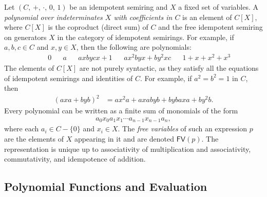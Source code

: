 \documentclass[copyright,creativecommons]{eptcs}
\theoremstyle{remark}
\newcommand\mathname[1]{\ensuremath{\mathsf{#1}}}
\newcommand\FV[1]{\mathname{FV}(#1)}
\newcommand\Tname{\mathname{T}}
\newcommand\T[1]{\Tname\,#1}
\newcommand{\fhcomment}[1]{\textcolor{red}{[\textbf{Comment (FH)}: {#1}]}}
\newcommand{\dkcomment}[1]{\textcolor{blue}{[\textbf{Comment (DK)}: {#1}]}}
\renewcommand{\fhcomment}[1]{}
\renewcommand{\dkcomment}[1]{}
\begin{document}
Let $(C,\,+,\,\cdot,\,0,\,1)$ be an idempotent semiring and $X$ a fixed set of variables. A \emph{polynomial over indeterminates $X$ with coefficients in $C$} is an element of $C[X]$, where $C[X]$ is the coproduct (direct sum) 
\fhcomment{Add: ``categorical'' before coproduct}\dkcomment{Why? What other kind is there?}\fhcomment{Good question.  I was thinking of categorical sum.}of $C$ and the free idempotent semiring on generators $X$ in the category of idempotent semirings. For example, if $a,b,c\in C$ and $x,y\in X$, then the following are polynomials:
\begin{align*}
&& 0 && a && axbycx + 1 && ax^2byx + by^2xc && 1 + x + x^2 + x^3
\end{align*}
The elements of $C[X]$ are not purely syntactic, as they satisfy all the equations of idempotent semirings and identities of $C$. For example, if 
$a^2=b^2=1$ in $C$, then
\begin{align*}
(axa + byb)^2 &= ax^2a + axabyb + bybaxa + by^2b.
\end{align*}
Every polynomial can be written as a finite sum of monomials of the form
\begin{align*}
a_0x_0a_1x_1\cdots a_{n-1}x_{n-1}a_n,
\end{align*}
where each $a_i\in C-\{0\}$ and $x_i\in X$. The \emph{free variables} of such an expression $p$ are the elements of $X$ appearing in it and are denoted $\FV p$. The representation is unique up to associativity of multiplication and associativity, commutativity, and idempotence of addition.

\fhcomment{Problem: ``Free variables'' not well-defined for $C[X]$.
Proposal: Change from $C[X]$ to introduction of polynomial expressions 
$\E X$, 
interpretation over polynomial expressions, analogous to $\T X$ of
Section 2.4.  We introduce ``free'' $\mu$-expressions in this version of the paper and the domain of $\sigma$ need not be a semiring anyway; gives simpler presentation since $C[X]$ not required, only expressions $\E X$ and their extension $\T X$ in Section 2.4.}\dkcomment{Actually, I believe it is well defined if you write the polynomial as a sum of monomials as I have described.}\fhcomment{I see, thanks. Should we add that every polynomial can be written \emph{uniquely} as a sum over a set of monomials?}

\subsection{Polynomial Functions and Evaluation}
\end{document}
